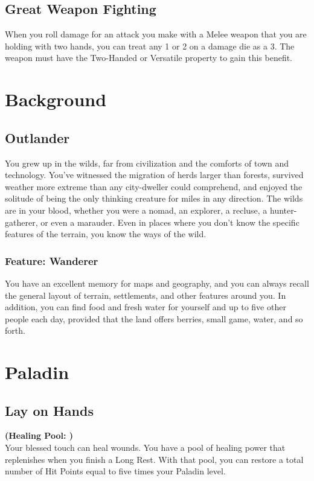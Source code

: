 \documentclass[letterpaper,openany,oneside,twocolumn]{book}
\begin{document}
\subsection*{Great Weapon Fighting}
When you roll damage for an attack you make with a Melee weapon that you are holding with two hands, you can treat any 1 or 2 on a damage die as a 3. The weapon must have the Two-Handed or Versatile property to gain this benefit.

\section*{Background}
\subsection*{Outlander}
You grew up in the wilds, far from civilization and the comforts of town and technology. You've witnessed the migration of herds larger than forests, survived weather more extreme than any city-dweller could comprehend, and enjoyed the solitude of being the only thinking creature for miles in any direction. The wilds are in your blood, whether you were a nomad, an explorer, a recluse, a hunter-gatherer, or even a marauder. Even in places where you don't know the specific features of the terrain, you know the ways of the wild.
\subsubsection*{Feature: Wanderer}
You have an excellent memory for maps and geography, and you can always recall the general layout of terrain, settlements, and other features around you. In addition, you can find food and fresh water for yourself and up to five other people each day, provided that the land offers berries, small game, water, and so forth.

\section*{Paladin}
\subsection*{Lay on Hands}
\textbf{(Healing Pool: )}\\
Your blessed touch can heal wounds. You have a pool of healing power that replenishes when you finish a Long Rest. With that pool, you can restore a total number of Hit Points equal to five times your Paladin level.
\end{document}
